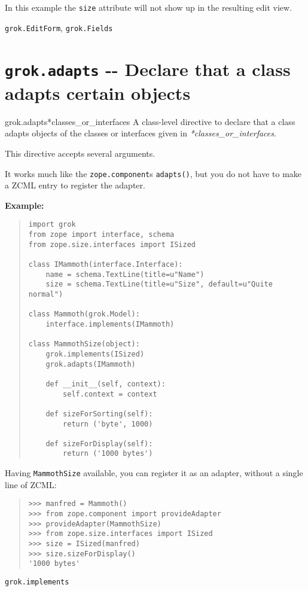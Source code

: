 \documentclass[10pt,a4paper,english]{manual}
\newcommand{\titlereference}[1]{\textsl{#1}}
\begin{document}
In this example the \texttt{size} attribute will not show up in the
resulting edit view.
\begin{seealso}

\texttt{grok.EditForm}, \texttt{grok.Fields}
\end{seealso}




\section{\texttt{grok.adapts} -{}- Declare that a class adapts certain objects}
\begin{funcdesc}{grok.adapts}{*classes{\_}or{\_}interfaces}
A class-level directive to declare that a class adapts objects of
the classes or interfaces given in \titlereference{*classes{\_}or{\_}interfaces}.

This directive accepts several arguments.

It works much like the \texttt{zope.component}s \texttt{adapts()},
but you do not have to make a ZCML entry to register the adapter.

\textbf{Example:}
\begin{quote}\begin{verbatim}
import grok
from zope import interface, schema
from zope.size.interfaces import ISized

class IMammoth(interface.Interface):
    name = schema.TextLine(title=u"Name")
    size = schema.TextLine(title=u"Size", default=u"Quite normal")

class Mammoth(grok.Model):
    interface.implements(IMammoth)

class MammothSize(object):
    grok.implements(ISized)
    grok.adapts(IMammoth)

    def __init__(self, context):
        self.context = context

    def sizeForSorting(self):
        return ('byte', 1000)

    def sizeForDisplay(self):
        return ('1000 bytes')
\end{verbatim}\end{quote}

Having \texttt{MammothSize} available, you can register it as an adapter,
without a single line of ZCML:
\begin{quote}\begin{verbatim}
>>> manfred = Mammoth()
>>> from zope.component import provideAdapter
>>> provideAdapter(MammothSize)
>>> from zope.size.interfaces import ISized
>>> size = ISized(manfred)
>>> size.sizeForDisplay()
'1000 bytes'
\end{verbatim}\end{quote}
\begin{seealso}

\texttt{grok.implements}
\end{seealso}

\end{funcdesc}
\end{document}
